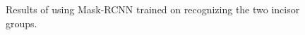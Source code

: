 \documentclass[a4paper]{article}
\begin{document}
\begin{figure}[H]
    \qquad
    \caption{Results of using Mask-RCNN\cite{MASK-RCNN} trained on recognizing the two incisor groups.}
  \label{fig:mask-rcnn-up-down}
\end{figure}
\end{document}

